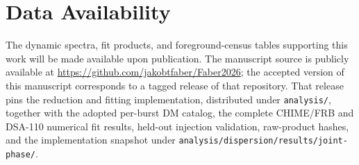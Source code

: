 \documentclass[twocolumn]{aastex631}
\begin{document}
\section*{Data Availability}
\label{sec:data-availability}
The dynamic spectra, fit products, and foreground-census tables supporting
this work will be made available upon publication. The manuscript source is
publicly available at \url{https://github.com/jakobtfaber/Faber2026}; the
accepted version of this manuscript corresponds to a tagged release of that
repository. That release pins the reduction and fitting implementation,
distributed under \texttt{analysis/}, together with the adopted per-burst DM
catalog, the complete CHIME/FRB and DSA-110 numerical fit results, held-out
injection validation, raw-product hashes, and the implementation snapshot under
\texttt{analysis/dispersion/results/joint-phase/}.



\appendix

% 



\end{document}
